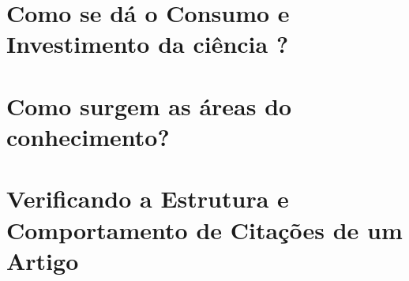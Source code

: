     

	\chapter{Como se dá o Consumo e Investimento da ciência ? \label{investimentoCiencia}}
	
	
	\chapter{Como surgem as áreas do conhecimento?
	\label{SurgemAreas}}
	
	
	\chapter{Verificando a Estrutura e Comportamento de Citações de um Artigo}
	\label{CitacoesCitacoes}
	

